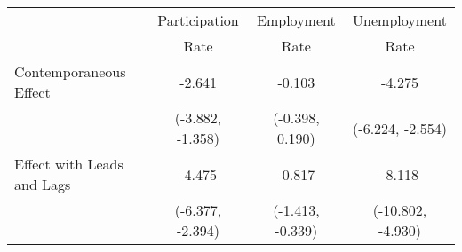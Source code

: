 \begin{tabular}{l|c|c|c}
\hline
\hline
& Participation & Employment & Unemployment \\
& Rate          & Rate       & Rate \\
\hline
Contemporaneous Effect
& -2.641 & -0.103 & -4.275 \\
& {\scriptsize (-3.882, -1.358)}& {\scriptsize (-0.398, 0.190)}& {\scriptsize (-6.224, -2.554)}\\ [0.1cm]
\hline
Effect with Leads and Lags
& -4.475 & -0.817 & -8.118 \\
& {\scriptsize (-6.377, -2.394)}& {\scriptsize (-1.413, -0.339)}& {\scriptsize (-10.802, -4.930)}\\ [0.1cm]
\hline
\hline
\end{tabular}
